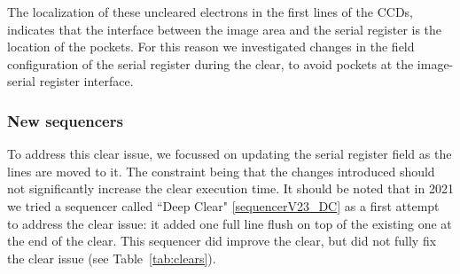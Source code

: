 The localization of these uncleared electrons in the first lines of the
CCDs, indicates that the interface between the image area and the serial register
is the location of the pockets. For this reason we investigated
changes in the field configuration of the serial register during the
clear, to avoid pockets at the image-serial register interface.

\subsubsection{New sequencers}\label{new-sequencers}

To address this clear issue, we focussed on updating the serial
register field as the lines are moved to it. The constraint being that
the changes introduced should not significantly increase the clear
execution time. It should be noted that in 2021 we tried a sequencer
called ``Deep Clear" \hyperref[sequencerV23_DC]{{[}sequencerV23\_DC{]}} as a first attempt to address the clear issue: it added one full line
flush on top of the existing one at the end of the clear. This sequencer
did improve the clear, but did  not fully fix the clear issue (see
Table~\ref{tab:clears}).

